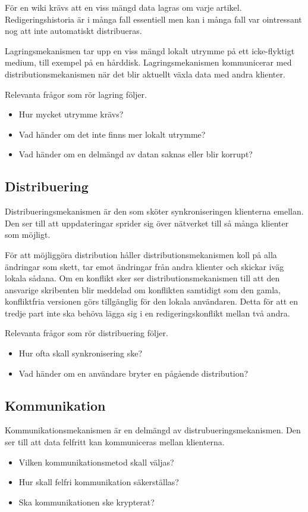 För en wiki krävs att en viss mängd data lagras om varje artikel. Redigeringshistoria är i många fall essentiell men kan i många fall var ointressant nog att inte automatiskt distribueras.

Lagringsmekanismen tar upp en viss mängd lokalt utrymme på ett icke-flyktigt medium, till exempel på en hårddisk. Lagringsmekanismen kommunicerar med distributionsmekanismen när det blir aktuellt växla data med andra klienter.

Relevanta frågor som rör lagring följer.
\begin{itemize}
\item Hur mycket utrymme krävs?
\item Vad händer om det inte finns mer lokalt utrymme?
\item Vad händer om en delmängd av datan saknas eller blir korrupt?
\end{itemize}
\subsection{Distribuering}
Distribueringsmekanismen är den som sköter synkroniseringen klienterna emellan. Den ser till att uppdateringar sprider sig över nätverket till så många klienter som möjligt.

För att möjliggöra distribution håller distributionsmekanismen koll på alla ändringar som skett, tar emot ändringar från andra klienter och skickar iväg lokala sådana. Om en konflikt sker ser distributionsmekanismen till att den ansvarige skribenten blir meddelad om konflikten samtidigt som den gamla, konfliktfria versionen görs tillgänglig för den lokala användaren. Detta för att en tredje part inte ska behöva lägga sig i en redigeringskonflikt mellan två andra.

Relevanta frågor som rör distribuering följer.
\begin{itemize}
\item Hur ofta skall synkronisering ske?
\item Vad händer om en användare bryter en pågående distribution?
\end{itemize}
\subsection{Kommunikation}
Kommunikationsmekanismen är en delmängd av distrubueringsmekanismen. Den ser till att data felfritt kan kommuniceras mellan klienterna.

\begin{itemize}
\item Vilken kommunikationsmetod skall väljas?
\item Hur skall felfri kommunikation säkerställas?
\item Ska kommunikationen ske krypterat?
\end{itemize}
